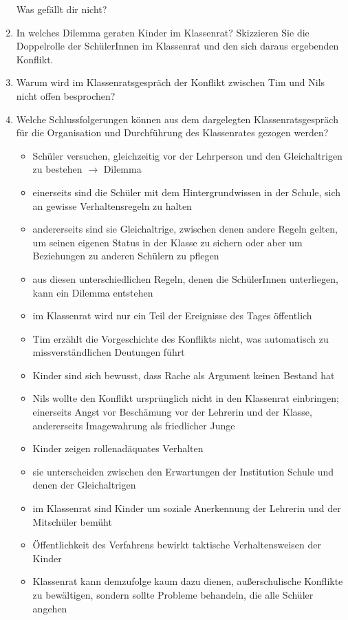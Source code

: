 \begin{enumerate}
{		\normalfont\sffamily\textsf{Was gefällt dir nicht?}\par
		\par
	}
	\item{
		In welches Dilemma geraten Kinder im Klassenrat?
		Skizzieren Sie die Doppelrolle der SchülerInnen im Klassenrat und den sich daraus ergebenden Konflikt.
	}
	\item{Warum wird im Klassenratsgespräch der Konflikt zwischen Tim und Nils nicht \glqq offen\grqq{} besprochen?}
	\item{
		Welche Schlussfolgerungen können aus dem dargelegten Klassenratsgespräch für die Organisation und Durchführung des Klassenrates gezogen werden?
		\begin{itemize}
			\item{Schüler versuchen, gleichzeitig vor der Lehrperson und den Gleichaltrigen zu bestehen $\rightarrow$ Dilemma}
			\item{einerseits sind die Schüler mit dem Hintergrundwissen in der Schule, sich an gewisse Verhaltensregeln zu halten}
			\item{andererseits sind sie Gleichaltrige, zwischen denen andere Regeln gelten, um seinen eigenen Status in der Klasse zu sichern oder aber um Beziehungen zu anderen Schülern zu pflegen}
			\item{aus diesen unterschiedlichen Regeln, denen die SchülerInnen unterliegen, kann ein Dilemma entstehen}
			\item{im Klassenrat wird nur ein Teil der Ereignisse des Tages öffentlich}
			\item{Tim erzählt die Vorgeschichte des Konflikts nicht, was automatisch zu missverständlichen Deutungen führt}
			\item{Kinder sind sich bewusst, dass Rache als Argument keinen Bestand hat}
			\item{Nils wollte den Konflikt ursprünglich nicht in den Klassenrat einbringen; einerseits Angst vor Beschämung vor der Lehrerin und der Klasse, andererseits Imagewahrung als friedlicher Junge}
			\item{Kinder zeigen rollenadäquates Verhalten}
			\item{sie unterscheiden zwischen den Erwartungen der Institution Schule und denen der Gleichaltrigen}
			\item{im Klassenrat sind Kinder um soziale Anerkennung der Lehrerin und der Mitschüler bemüht}
			\item{Öffentlichkeit des Verfahrens bewirkt taktische Verhaltensweisen der Kinder}
			\item{Klassenrat kann demzufolge kaum dazu dienen, außerschulische Konflikte zu bewältigen, sondern sollte Probleme behandeln, die alle Schüler angehen}
		\end{itemize}
	}
\end{enumerate}